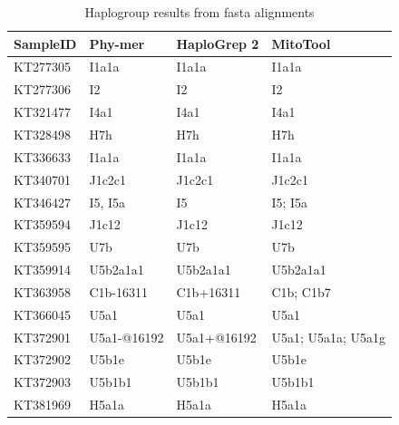 \begin{footnotesize}
\begin{longtable}{|l|l|l|l|}
\caption{Haplogroup results from fasta alignments} \label{app:table} \\
\hline
\textbf{SampleID} & \textbf{Phy-mer} & \textbf{HaploGrep 2} & \textbf{MitoTool}           \\ \hline
KT277305          & I1a1a            & I1a1a                & I1a1a                       \\ \hline
KT277306          & I2               & I2                   & I2                          \\ \hline
KT321477          & I4a1             & I4a1                 & I4a1                        \\ \hline
KT328498          & H7h              & H7h                  & H7h                         \\ \hline
KT336633          & I1a1a            & I1a1a                & I1a1a                       \\ \hline
KT340701          & J1c2c1           & J1c2c1               & J1c2c1                      \\ \hline
KT346427          & I5, I5a          & I5                   & I5; I5a                     \\ \hline
KT359594          & J1c12            & J1c12                & J1c12                       \\ \hline
KT359595          & U7b              & U7b                  & U7b                         \\ \hline
KT359914          & U5b2a1a1         & U5b2a1a1             & U5b2a1a1                    \\ \hline
KT363958          & C1b-16311        & C1b+16311            & C1b; C1b7                   \\ \hline
KT366045          & U5a1             & U5a1                 & U5a1                        \\ \hline
KT372901          & U5a1-@16192      & U5a1+@16192          & U5a1; U5a1a; U5a1g          \\ \hline
KT372902          & U5b1e            & U5b1e                & U5b1e                       \\ \hline
KT372903          & U5b1b1           & U5b1b1               & U5b1b1                      \\ \hline
KT381969          & H5a1a            & H5a1a                & H5a1a                       \\ \hline

\end{longtable}
\end{footnotesize}

